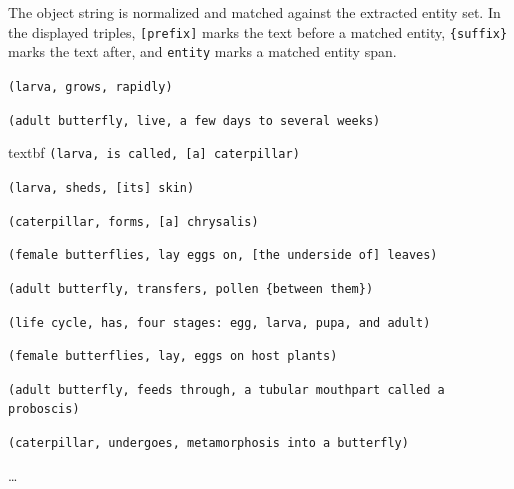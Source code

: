 \documentclass[11pt]{article}
\begin{document}
The object string is normalized and matched against the extracted entity set. In the displayed triples, \texttt{[prefix]} marks the text before a matched entity, \texttt{\{suffix\}} marks the text after, and \texttt{\guillemotleft entity\guillemotright} marks a matched entity span.{%


\textbf{}
\texttt{(larva, grows, rapidly)}\par
\texttt{(adult butterfly, live, a few days to several weeks)}

textbf{}
\texttt{(larva, is called, [a] \guillemotleft caterpillar\guillemotright)}\par
\texttt{(larva, sheds, [its] \guillemotleft skin\guillemotright)}\par
\texttt{(caterpillar, forms, [a] \guillemotleft chrysalis\guillemotright)}\par
\texttt{(female butterflies, lay eggs on, [the underside of] \guillemotleft leaves\guillemotright)}\par
\texttt{(adult butterfly, transfers, \guillemotleft pollen\guillemotright\ \{between them\})}

\textbf{}
\texttt{(life cycle, has, four stages: \guillemotleft egg\guillemotright, \guillemotleft larva\guillemotright, \guillemotleft pupa\guillemotright, and \guillemotleft adult\guillemotright)}\par
\texttt{(female butterflies, lay, \guillemotleft eggs\guillemotright\ on \guillemotleft host plants\guillemotright)}\par
\texttt{(adult butterfly, feeds through, a \guillemotleft tubular mouthpart\guillemotright\ called a \guillemotleft proboscis\guillemotright)}\par
\texttt{(caterpillar, undergoes, \guillemotleft metamorphosis\guillemotright\ into a \guillemotleft butterfly\guillemotright)}\par
\dots%
}
\end{document}
